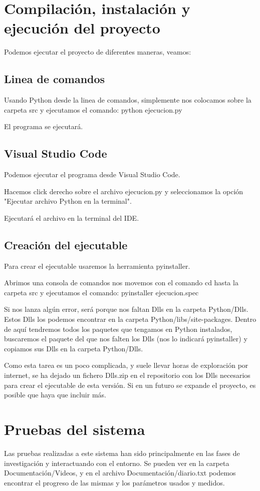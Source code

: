 \section{Compilación, instalación y ejecución del proyecto}

Podemos ejecutar el proyecto de diferentes maneras, veamos:

\subsection{Linea de comandos}
Usando Python desde la linea de comandos, simplemente nos colocamos sobre la carpeta src y ejecutamos el comando: python ejecucion.py 

El programa se ejecutará.

\subsection{Visual Studio Code}
Podemos ejecutar el programa desde Visual Studio Code.


Hacemos click derecho sobre el archivo ejecucion.py y seleccionamos la opción "Ejecutar archivo Python en la terminal".


Ejecutará el archivo en la terminal del IDE.

\subsection{Creación del ejecutable}
Para crear el ejecutable usaremos la herramienta pyinstaller.

Abrimos una consola de comandos nos movemos con el comando cd hasta la carpeta src y ejecutamos el comando: pyinstaller ejecucion.spec

Si nos lanza algún error, será porque nos faltan Dlls en la carpeta Python/Dlls. Estos Dlls los podemos encontrar en la carpeta Python/libs/site-packages. Dentro de aquí tendremos todos los paquetes que tengamos en Python instalados, buscaremos el paquete del que nos falten los Dlls (nos lo indicará pyinstaller) y copiamos sus Dlls en la carpeta Python/Dlls.

Como esta tarea es un poco complicada, y suele llevar horas de exploración por internet, se ha dejado un fichero Dlls.zip en el repositorio con los Dlls necesarios para crear el ejecutable de esta versión. Si en un futuro se expande el proyecto, es posible que haya que incluir más.

\section{Pruebas del sistema}
Las pruebas realizadas a este sistema han sido principalmente en las fases de investigación y interactuando con el entorno. Se pueden ver en la carpeta Documentación/Videos, y en el archivo Documentación/diario.txt podemos encontrar el progreso de las mismas y los parámetros usados y medidos.
